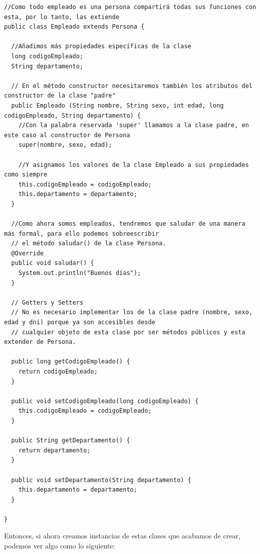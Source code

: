 \documentclass[11pt]{article}
\begin{document}
\begin{verbatim}
//Como todo empleado es una persona compartirá todas sus funciones con esta, por lo tanto, las extiende
public class Empleado extends Persona {

  //Añadimos más propiedades específicas de la clase
  long codigoEmpleado;
  String departamento;

  // En el método constructor necesitaremos también los atributos del constructor de la clase "padre"
  public Empleado (String nombre, String sexo, int edad, long codigoEmpleado, String departamento) {
    //Con la palabra reservada 'super' llamamos a la clase padre, en este caso al constructor de Persona
    super(nombre, sexo, edad);

    //Y asignamos los valores de la clase Empleado a sus propiedades como siempre
    this.codigoEmpleado = codigoEmpleado;
    this.departamento = departamento;
  }

  //Como ahora somos empleados, tendremos que saludar de una manera más formal, para ello podemos sobreescribir
  // el método saludar() de la clase Persona.
  @Override
  public void saludar() {
    System.out.println("Buenos días");
  }

  // Getters y Setters
  // No es necesario implementar los de la clase padre (nombre, sexo, edad y dni) porque ya son accesibles desde
  // cualquier objeto de esta clase por ser métodos públicos y esta extender de Persona.

  public long getCodigoEmpleado() {
    return codigoEmpleado;
  }

  public void setCodigoEmpleado(long codigoEmpleado) {
    this.codigoEmpleado = codigoEmpleado;
  }

  public String getDepartamento() {
    return departamento;
  }

  public void setDepartamento(String departamento) {
    this.departamento = departamento;
  }

}
\end{verbatim}

Entonces, si ahora creamos instancias de estas clases que acabamos de crear, podemos ver algo como lo siguiente:
\end{document}
